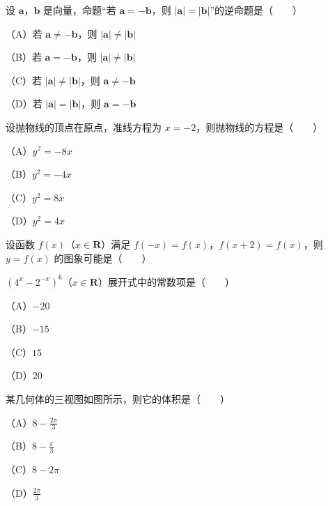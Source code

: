 

\begin{question}
设 $\boldsymbol a$，$\boldsymbol b$ 是向量，命题“若 $\boldsymbol a=-\boldsymbol b$，则 $|\boldsymbol a|=|\boldsymbol b|$”的逆命题是\mbox{（　　）}

（A）若 $\boldsymbol a\ne-\boldsymbol b$，则 $|\boldsymbol a|\ne|\boldsymbol b|$

（B）若 $\boldsymbol a=-\boldsymbol b$，则 $|\boldsymbol a|\ne|\boldsymbol b|$

（C）若 $|\boldsymbol a|\ne|\boldsymbol b|$，则 $\boldsymbol a\ne-\boldsymbol b$

（D）若 $|\boldsymbol a|=|\boldsymbol b|$，则 $\boldsymbol a=-\boldsymbol b$

\end{question}
\begin{question}
设抛物线的顶点在原点，准线方程为 $x=-2$，则抛物线的方程是\mbox{（　　）}

（A）$y^2=-8x$

（B）$y^2=-4x$

（C）$y^2=8x$

（D）$y^2=4x$

\Needspace{0.4\textheight}
\end{question}
\begin{question}
设函数 $f(x)$（$x\in\mathbf R$）满足 $f(-x)=f(x)$，$f(x+2)=f(x)$，则 $y=f(x)$ 的图象可能是\mbox{（　　）}
\nopagebreak[4]
\begin{center}\end{center}
\nopagebreak[4]
\end{question}
\begin{question}
$(4^x-2^{-x})^6$（$x\in\mathbf R$）展开式中的常数项是\mbox{（　　）}

（A）$-20$

（B）$-15$

（C）$15$

（D）$20$

\Needspace{0.4\textheight}
\end{question}
\begin{question}
某几何体的三视图如图所示，则它的体积是\mbox{（　　）}

（A）$8-\frac{2\pi}3$

（B）$8-\frac{\pi}3$

（C）$8-2\pi$

（D）$\frac{2\pi}3$
\nopagebreak[4]
\begin{center}\end{center}
\nopagebreak[4]
\end{question}
